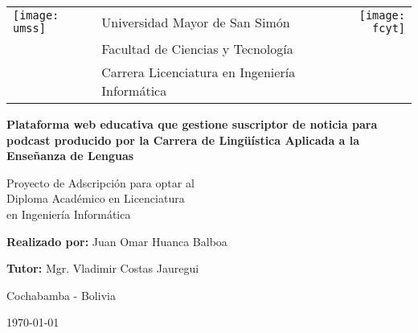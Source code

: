 
\begin{titlepage}
	
	\begin{tabular}[t]{l p{11cm} r}
	\texttt{[image: umss]} & \centering \large{Universidad Mayor de San Simón} &	\texttt{[image: fcyt]} \\
		& \centering \large{Facultad de Ciencias y Tecnología} & \\
		& \centering \large{Carrera Licenciatura en Ingeniería Informática} & \\
	\end{tabular}
	
	
	\begin{center}
		\normalsize
		
		\vspace{1.5cm}
		\Large{
		\textbf{Plataforma web educativa que gestione suscriptor de noticia para podcast producido por la Carrera de Lingüística Aplicada a la Enseñanza de Lenguas} 
		}		\\
	
		\vspace{1.5cm}
	
		\small
	\end{center}
		
	\begin{flushright}
	
		Proyecto de Adscripción para optar al \\ 
		Diploma Académico en Licenciatura \\ 
		en Ingeniería Informática	
		
	\end{flushright}
	
	\begin{center}
		
		\vspace{1.5cm}
			
		\textbf{Realizado por:} Juan Omar Huanca Balboa \\
	
		\vspace{1.5cm}
	
		\textbf{Tutor:} Mgr. Vladimir Costas Jauregui \\
		
		\vspace{1.5cm}
		
		Cochabamba - Bolivia
	
		\vspace{1.5cm}
					
		\monthYear\today
		
	\end{center}			

\end{titlepage}
